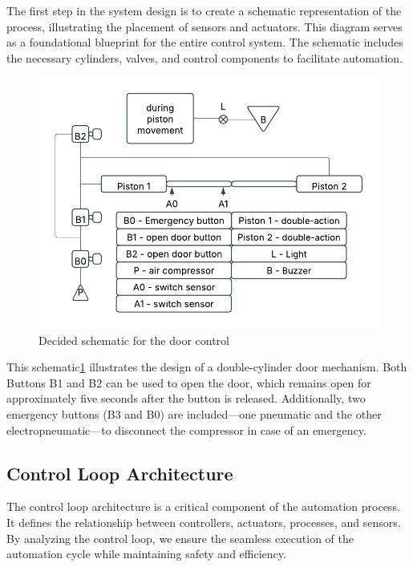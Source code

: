 The first step in the system design is to create a schematic representation of the process, 
illustrating the placement of sensors and actuators. This diagram serves as a foundational blueprint 
for the entire control system. The schematic includes the necessary cylinders, valves, and control 
components to facilitate automation.

\begin{figure}[H]
    \includegraphics[width=16cm]{Images/Q1/schematic.png}
    \centering
    \caption{Decided schematic for the door control}
    \label{fig:schematic}
\end{figure}

This schematic\ref{fig:schematic} illustrates the design of a double-cylinder door mechanism. Both Buttons B1 and B2 
can be used to open the door, which remains open for approximately five seconds after the button is 
released. Additionally, two emergency buttons (B3 and B0) are included—one pneumatic and the other 
electropneumatic—to disconnect the compressor in case of an emergency.

\subsection{Control Loop Architecture} \label{sec:Control_Loop_Architecture}

The control loop architecture is a critical component of the automation process. It 
defines the relationship between controllers, actuators, processes, and sensors. By 
analyzing the control loop, we ensure the seamless execution of the automation cycle while maintaining safety and efficiency.

